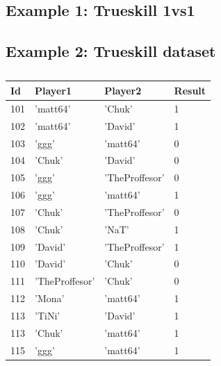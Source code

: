 \documentclass[article]{jss}
\begin{document}
\subsection{Example 1: Trueskill 1vs1}


\subsection{Example 2: Trueskill dataset}
\begin{table}[]
	\centering
		\begin{tabular}{llll}
			\hline
			Id  & Player1        & Player2        & Result \\ \hline
			101 & 'matt64'       & 'Chuk'         & 1      \\
			102 & 'matt64'       & 'David'        & 1      \\
			103 & 'ggg'          & 'matt64'       & 0      \\
			104 & 'Chuk'         & 'David'        & 0      \\
			105 & 'ggg'          & 'TheProffesor' & 0      \\
			106 & 'ggg'          & 'matt64'       & 1      \\
			107 & 'Chuk'         & 'TheProffesor' & 0      \\
			108 & 'Chuk'         & 'NaT'          & 1      \\
			109 & 'David'        & 'TheProffesor' & 1      \\
			110 & 'David'        & 'Chuk'         & 0      \\
			111 & 'TheProffesor' & 'Chuk'         & 0      \\
			112 & 'Mona'         & 'matt64'       & 1      \\
			113 & 'TiNi'         & 'David'        & 1      \\
			113 & 'Chuk'         & 'matt64'       & 1      \\
			115 & 'ggg'          & 'matt64'       & 1      \\ \hline
		\end{tabular}%
	\caption{}
	\label{tab:my-table}
\end{table}


\end{document}
